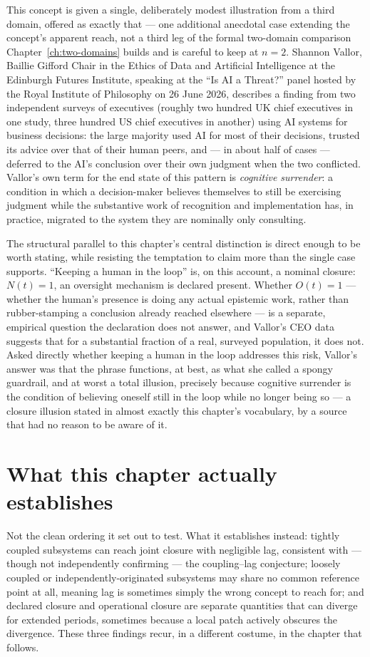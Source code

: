 This concept is given a single, deliberately modest illustration from a third domain, offered as exactly that --- one additional anecdotal case extending the concept's apparent reach, not a third leg of the formal two-domain comparison Chapter~\ref{ch:two-domains} builds and is careful to keep at $n=2$. Shannon Vallor, Baillie Gifford Chair in the Ethics of Data and Artificial Intelligence at the Edinburgh Futures Institute, speaking at the ``Is AI a Threat?'' panel hosted by the Royal Institute of Philosophy on 26 June 2026, describes a finding from two independent surveys of executives (roughly two hundred UK chief executives in one study, three hundred US chief executives in another) using AI systems for business decisions: the large majority used AI for most of their decisions, trusted its advice over that of their human peers, and --- in about half of cases --- deferred to the AI's conclusion over their own judgment when the two conflicted. Vallor's own term for the end state of this pattern is \emph{cognitive surrender}: a condition in which a decision-maker believes themselves to still be exercising judgment while the substantive work of recognition and implementation has, in practice, migrated to the system they are nominally only consulting.

The structural parallel to this chapter's central distinction is direct enough to be worth stating, while resisting the temptation to claim more than the single case supports. ``Keeping a human in the loop'' is, on this account, a nominal closure: $N(t) = 1$, an oversight mechanism is declared present. Whether $O(t) = 1$ --- whether the human's presence is doing any actual epistemic work, rather than rubber-stamping a conclusion already reached elsewhere --- is a separate, empirical question the declaration does not answer, and Vallor's CEO data suggests that for a substantial fraction of a real, surveyed population, it does not. Asked directly whether keeping a human in the loop addresses this risk, Vallor's answer was that the phrase functions, at best, as what she called a spongy guardrail, and at worst a total illusion, precisely because cognitive surrender is the condition of believing oneself still in the loop while no longer being so --- a closure illusion stated in almost exactly this chapter's vocabulary, by a source that had no reason to be aware of it.

\section{What this chapter actually establishes}

Not the clean ordering it set out to test. What it establishes instead: tightly coupled subsystems can reach joint closure with negligible lag, consistent with --- though not independently confirming --- the coupling--lag conjecture; loosely coupled or independently-originated subsystems may share no common reference point at all, meaning lag is sometimes simply the wrong concept to reach for; and declared closure and operational closure are separate quantities that can diverge for extended periods, sometimes because a local patch actively obscures the divergence. These three findings recur, in a different costume, in the chapter that follows.
